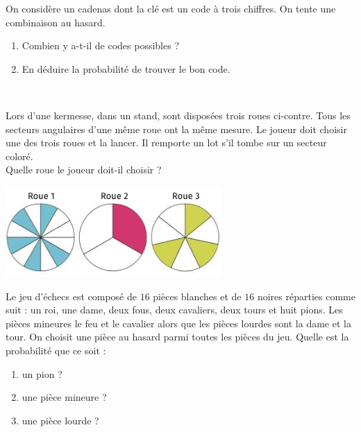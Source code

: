 \documentclass[11pt]{article}
\begin{document}
\begin{exo}
  On considère un cadenas dont la clé est un code à trois chiffres. On tente une
  combinaison au hasard.
  \begin{enumerate}
    \item Combien y a-t-il de codes possibles ?
    \item En déduire la probabilité de trouver le bon code.
  \end{enumerate}
\end{exo}

\begin{exo}~\\
  \begin{minipage}[]{.5\textwidth}
    Lors d'une kermesse, dans un stand, sont disposées trois roues ci-contre.
    Tous les secteurs angulaires d'une même roue ont la même mesure. Le joueur
    doit choisir une des trois roues et la lancer. Il remporte un lot s'il tombe
    sur un secteur coloré.\\
    Quelle roue le joueur doit-il choisir ?
  \end{minipage}
  \begin{minipage}[]{.5\textwidth}
    \begin{center}
      \includegraphics[scale=.7]{roues.png}
    \end{center}
  \end{minipage}
\end{exo}

\begin{exo}
  Le jeu d'échecs est composé de $16$ pièces blanches et de $16$ noires
  réparties comme suit : un roi, une dame, deux fous, deux cavaliers, deux tours
  et huit pions. Les pièces mineures le feu et le cavalier alors que les pièces
  lourdes sont la dame et la tour. On choisit une pièce au hasard parmi toutes
  les pièces du jeu. Quelle est la probabilité que ce soit :
  \begin{enumerate}
    \item un pion ?
    \item une pièce mineure ?
    \item une pièce lourde ?
  \end{enumerate}
\end{exo}
\end{document}
